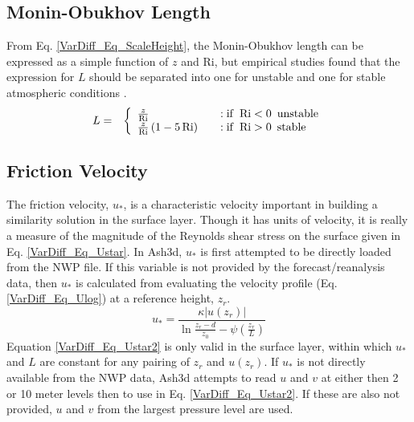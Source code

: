 \subsection{Monin-Obukhov Length}
From Eq. \ref{VarDiff_Eq_ScaleHeight}, the Monin-Obukhov length can be expressed as
a simple function of $z$ and $\mathrm{Ri}$, but empirical studies found that
the expression for $L$ should be separated into one for unstable and one for stable 
atmospheric conditions \cite[p.141; Eq.6.7.1-2]{Panofsky1984}.
\begin{eqnarray}\label{VarDiff_Eq_MonL}
L &=& \left\{ \begin{array} {l@{\quad \quad}l}
 \frac{z}{\mathrm{Ri}}                 &:  \mathrm{if}\,\,\, \mathrm{Ri}<0 \,\,\, \mathrm{unstable} \\
\frac{z}{\mathrm{Ri}}\left(1-5\,\mathrm{Ri}\right)  &:  \mathrm{if}\,\,\, \mathrm{Ri}>0 \,\,\, \mathrm{stable}
\end{array}
\right.
\end{eqnarray}


\subsection{Friction Velocity}
The friction velocity, $u_*$, is a characteristic velocity important in building a similarity
solution in the surface layer. Though it has units of velocity, it is really a measure
of the magnitude of the Reynolds shear stress on the surface given in Eq. \ref{VarDiff_Eq_Ustar}.
In Ash3d, $u_*$ is first attempted to be directly loaded from the NWP file. If this variable is not
provided by the forecast/reanalysis data, then $u_*$ is calculated from evaluating the velocity
profile (Eq. \ref{VarDiff_Eq_Ulog}) at a reference height, $z_r$.
\begin{equation}\label{VarDiff_Eq_Ustar2}
u_* = \frac{\kappa |u(z_r)|}{\ln \frac{z_r-d}{z_0} - \psi(\frac{z_r}{L})}
\end{equation}
Equation \ref{VarDiff_Eq_Ustar2} is only valid in the surface layer, within which
$u_*$ and $L$ are constant for any pairing of $z_r$ and $u(z_r)$. If $u_*$ is not directly available
from the NWP data, Ash3d attempts to read $u$ and $v$ at either then 2 or 10 meter levels then to
use in Eq. \ref{VarDiff_Eq_Ustar2}. If these are also not provided, $u$ and $v$ from the largest
pressure level are used.

